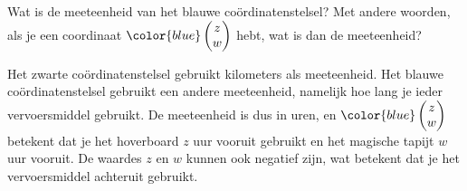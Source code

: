 \documentclass{ximera}
\begin{document}
\begin{exercise}
    Wat is de meeteenheid van het blauwe coördinatenstelsel? Met andere woorden, als je een coordinaat \(\color{blue}\begin{pmatrix} z \\ w \end{pmatrix}\) hebt, wat is dan de meeteenheid?
    \begin{oplossing}
        Het zwarte coördinatenstelsel gebruikt kilometers als meeteenheid.
        Het blauwe coördinatenstelsel gebruikt een andere meeteenheid, namelijk hoe lang je ieder vervoersmiddel gebruikt.
        De meeteenheid is dus in uren, en \(\color{blue}\begin{pmatrix} z \\ w \end{pmatrix}\) betekent dat je het hoverboard \(z\) uur vooruit gebruikt en het magische tapijt \(w\) uur vooruit.
        De waardes \(z\) en \(w\) kunnen ook negatief zijn, wat betekent dat je het vervoersmiddel achteruit gebruikt.
    \end{oplossing}
\end{exercise}
\end{document}
